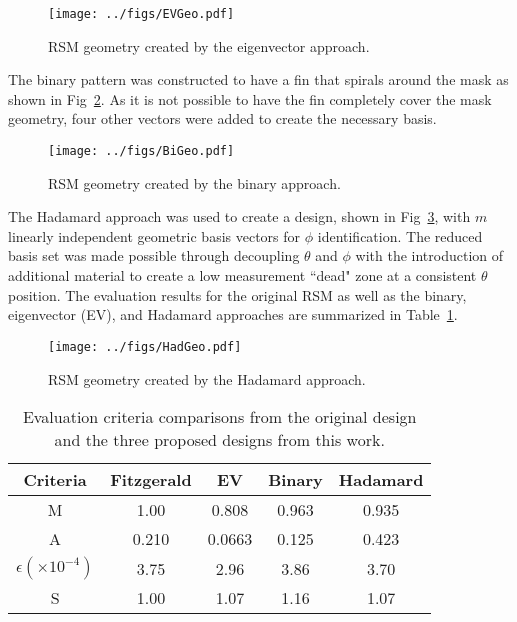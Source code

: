 \documentclass[twocolumn,10pt,final]{asme2ej}
\begin{document}
\vspace{-0.2 cm}
\begin{figure}[ht!]
\centering
\texttt{[image: ../figs/EVGeo.pdf]}
\caption{RSM geometry created by the eigenvector approach.}
\label{fig:EVGeo}
\end{figure}
\vspace{-0.3 cm}

The binary pattern was constructed to have a fin that spirals around the mask as shown in Fig~\ref{fig:BiGeo}.  
As it is not possible to have the fin completely cover the mask geometry, four other vectors were added to create the necessary basis. 

\vspace{-0.2 cm}
\begin{figure}[ht!]
\texttt{[image: ../figs/BiGeo.pdf]}
\centering
\caption{RSM geometry created by the binary approach.}
\label{fig:BiGeo}
\end{figure}
\vspace{-0.3 cm}

The Hadamard approach was used to create a design, shown in Fig~\ref{fig:HadGeo}, with $m$ linearly independent geometric basis vectors for $\phi$ identification.
The reduced basis set was made possible through decoupling $\theta$ and $\phi$ with the introduction of additional material to create a low measurement ``dead" zone at a consistent $\theta$ position.  
The evaluation results for the original RSM as well as the binary, eigenvector (EV), and Hadamard approaches are summarized in Table~\ref{table:results}.

\vspace{-0.2 cm}
\begin{figure}[ht!]
\centering
\texttt{[image: ../figs/HadGeo.pdf]}
\caption{RSM geometry created by the Hadamard approach.}
\label{fig:HadGeo}
\end{figure}
\vspace{-0.3 cm}
  
\vspace{-0.6 cm}
\begin{table}[ht]
\caption{Evaluation criteria comparisons from the original design and the three proposed designs from this work.} %
\centering %
\begin{tabular}{|c|c|c|c|c|} %
\hline
Criteria & Fitzgerald & EV & Binary & Hadamard\\
\hline
M & 1.00 & 0.808 & 0.963 & 0.935\\
\hline
A & 0.210 & 0.0663 & 0.125 & 0.423 \\
\hline
$\epsilon \left(\times 10^{-4}\right)$ & 3.75 & 2.96 & 3.86 & 3.70\\
\hline
S & 1.00 & 1.07 & 1.16 & 1.07 \\
\hline
\end{tabular}
\label{table:results} %
\end{table}
\vspace{-0.3 cm}
\end{document}
